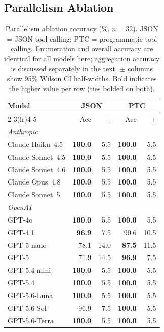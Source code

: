 \documentclass[11pt]{article}
\begin{document}
\subsection{Parallelism Ablation}
\label{sec:parallelism}

\begin{table}[t]
\centering
\footnotesize
\setlength{\tabcolsep}{3pt}
\begin{tabular}{lrrrr}
\toprule
\textbf{Model} & \multicolumn{2}{c}{\textbf{JSON}} & \multicolumn{2}{c}{\textbf{PTC}} \\
\cmidrule(lr){2-3}\cmidrule(lr){4-5}
 & Acc & $\pm$ & Acc & $\pm$ \\
\midrule
\multicolumn{5}{l}{\textit{Anthropic}} \\
Claude Haiku~4.5  & \textbf{100.0} & 5.5 & \textbf{100.0} & 5.5 \\
Claude Sonnet~4.5 & \textbf{100.0} & 5.5 & \textbf{100.0} & 5.5 \\
Claude Sonnet~4.6 & \textbf{100.0} & 5.5 & \textbf{100.0} & 5.5 \\
Claude Opus~4.8   & \textbf{100.0} & 5.5 & \textbf{100.0} & 5.5 \\
Claude Sonnet~5   & \textbf{100.0} & 5.5 & \textbf{100.0} & 5.5 \\
\midrule
\multicolumn{5}{l}{\textit{OpenAI}} \\
GPT-4o            & \textbf{100.0} & 5.5  & \textbf{100.0} & 5.5 \\
GPT-4.1           &  \textbf{96.9} & 7.5  &  90.6 & 10.5 \\
GPT-5-nano        &  78.1 & 14.0 & \textbf{87.5} & 11.5 \\
GPT-5             &  71.9 & 14.5 & \textbf{96.9} &  7.5 \\
GPT-5.4-mini      & \textbf{100.0} & 5.5  & \textbf{100.0} & 5.5 \\
GPT-5.4           & \textbf{100.0} & 5.5  & \textbf{100.0} & 5.5 \\
GPT-5.6-Luna      & \textbf{100.0} & 5.5  & \textbf{100.0} & 5.5 \\
GPT-5.6-Sol       &  96.9 & 7.5  & \textbf{100.0} & 5.5 \\
GPT-5.6-Terra     & \textbf{100.0} & 5.5  & \textbf{100.0} & 5.5 \\
\bottomrule
\end{tabular}
\caption{Parallelism ablation accuracy (\%, $n=32$). JSON = JSON tool calling;
PTC = programmatic tool calling. Enumeration and overall
accuracy are identical for all models here; aggregation accuracy is discussed
separately in the text. $\pm$ columns show 95\% Wilson CI half-widths. Bold
indicates the higher value per row (ties bolded on both).}
\label{tab:parallelism}
\end{table}
\end{document}

